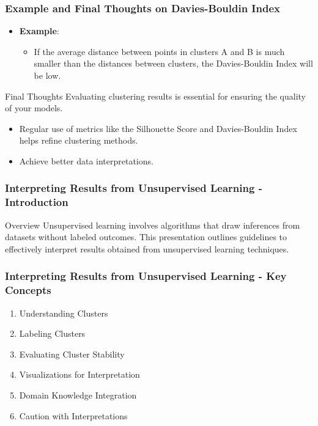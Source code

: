 \documentclass[aspectratio=169]{beamer}
\begin{document}
\begin{frame}[fragile]
    \frametitle{Example and Final Thoughts on Davies-Bouldin Index}
    \begin{itemize}
        \item \textbf{Example}:
            \begin{itemize}
                \item If the average distance between points in clusters A and B is much smaller than the distances between clusters, the Davies-Bouldin Index will be low.
            \end{itemize}
    \end{itemize}
    
    \begin{block}{Final Thoughts}
        Evaluating clustering results is essential for ensuring the quality of your models.
        \begin{itemize}
            \item Regular use of metrics like the Silhouette Score and Davies-Bouldin Index helps refine clustering methods.
            \item Achieve better data interpretations.
        \end{itemize}
    \end{block}
\end{frame}

\begin{frame}[fragile]
    \frametitle{Interpreting Results from Unsupervised Learning - Introduction}
    \begin{block}{Overview}
        Unsupervised learning involves algorithms that draw inferences from datasets without labeled outcomes. 
        This presentation outlines guidelines to effectively interpret results obtained from unsupervised learning techniques.
    \end{block}
\end{frame}

\begin{frame}[fragile]
    \frametitle{Interpreting Results from Unsupervised Learning - Key Concepts}
    \begin{enumerate}
        \item Understanding Clusters
        \item Labeling Clusters
        \item Evaluating Cluster Stability
        \item Visualizations for Interpretation
        \item Domain Knowledge Integration
        \item Caution with Interpretations
    \end{enumerate}
\end{frame}
\end{document}
